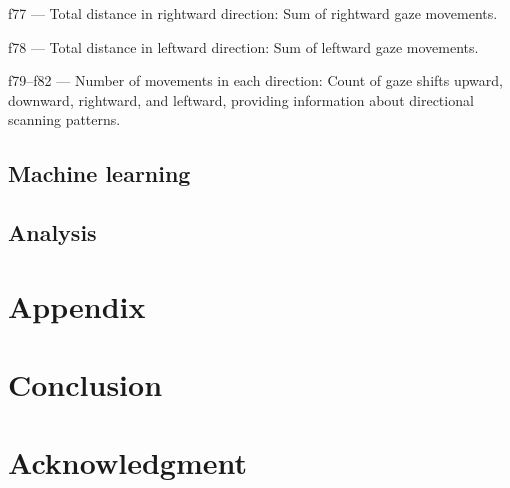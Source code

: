 \documentclass{article}
\begin{document}
f77 — Total distance in rightward direction: Sum of rightward gaze movements.

f78 — Total distance in leftward direction: Sum of leftward gaze movements.

f79–f82 — Number of movements in each direction: Count of gaze shifts upward, downward, rightward, and leftward, providing information about directional scanning patterns.






\subsection{Machine learning}
\subsection{Analysis}

\section{Appendix}
\section{Conclusion}
\noindent
\section{Acknowledgment}


\newpage
\end{document}
